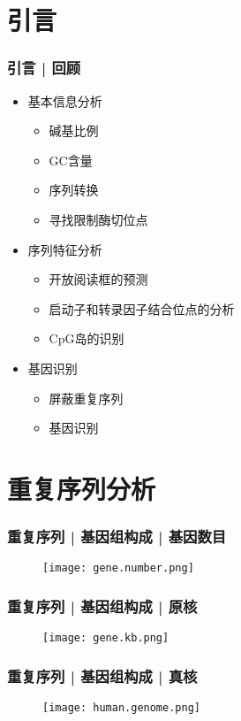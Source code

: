 \section{引言}
\begin{frame}
  \frametitle{引言 | 回顾}
  \begin{itemize}[<+-|alert@+>]
    \item 基本信息分析
      \begin{itemize}
        \item 碱基比例
        \item GC含量
        \item 序列转换
        \item 寻找限制酶切位点
      \end{itemize}
    \item 序列特征分析
      \begin{itemize}
        \item 开放阅读框的预测
        \item 启动子和转录因子结合位点的分析
        \item CpG岛的识别
      \end{itemize}
    \item 基因识别
      \begin{itemize}
        \item 屏蔽重复序列
        \item 基因识别
      \end{itemize}
  \end{itemize}
\end{frame}

\section{重复序列分析}

\begin{frame}
  \frametitle{重复序列 | 基因组构成 | 基因数目}
  \begin{figure}
    \centering
    \texttt{[image: gene.number.png]}
  \end{figure}
\end{frame}

\begin{frame}
  \frametitle{重复序列 | 基因组构成 | 原核}
  \begin{figure}
    \centering
    \texttt{[image: gene.kb.png]}
  \end{figure}
\end{frame}

\begin{frame}
  \frametitle{重复序列 | 基因组构成 | 真核}
  \begin{figure}
    \centering
    \texttt{[image: human.genome.png]}
  \end{figure}
\end{frame}

